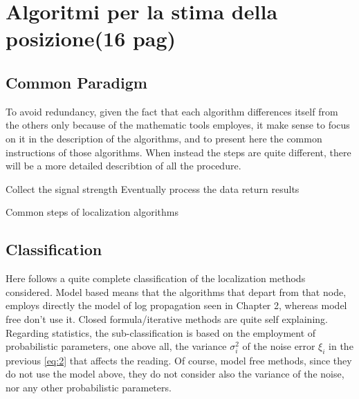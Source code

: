 \documentclass[12pt,twoside]{report}
\begin{document}
\clearpage

\chapter{Algoritmi per la stima della posizione(16 pag)}
\section{Common Paradigm}
To avoid redundancy, given the fact that each algorithm differences itself from the others only because of the mathematic tools employes, it make sense to focus on it in the description of the algorithms, and to present here the common instructions of those algorithms.
When instead the steps are quite different, there will be a more detailed describtion of all the procedure.

\begin{algorithm}[H]
\SetAlgoLined
Collect the signal strength\;
Eventually process the data\;
return results\;
 \caption{Common steps of localization algorithms}
\end{algorithm}

\section{Classification}
Here follows a quite complete classification of the localization methods considered. Model based means that the algorithms that depart from that node, employs directly the model of log propagation seen in Chapter 2, whereas model free don't use it. Closed formula/iterative methods are quite self explaining. Regarding statistics, the sub-classification is based on the employment of probabilistic parameters, one above all, the variance $\sigma^2_i$ of the noise error $\xi_i$ in the previous \ref{eq:2} that affects the reading. Of course, model free methods, since they do not use the model above, they do not consider also the variance of the noise, nor any other probabilistic parameters.

\begin{sidewaysfigure}
\end{sidewaysfigure}
\end{document}
